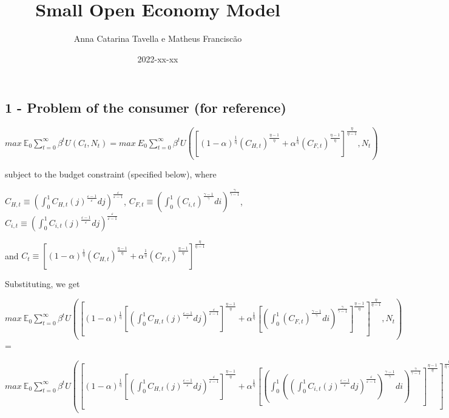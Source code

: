 \documentclass[
]{article}
\title{Small Open Economy Model}
\author{Anna Catarina Tavella e Matheus Franciscão}
\date{2022-xx-xx}
\begin{document}
\maketitle

\hypertarget{problem-of-the-consumer-for-reference}{%
\subsection{1 - Problem of the consumer (for
reference)}\label{problem-of-the-consumer-for-reference}}

\(\displaystyle {max} \ \mathbb{E}_0 \sum_{t=0}^\infty \beta^tU(C_t,N_t) = \displaystyle {max} \ E_0 \sum_{t=0}^\infty \beta^tU \left(\left[ (1-\alpha)^{\frac{1}{\eta}} (C_{H,t})^{\frac{\eta-1}{\eta}} + \alpha^{\frac{1}{\eta}} (C_{F,t})^{\frac{\eta-1}{\eta}} \right]^{\frac{\eta}{\eta-1}},N_t \right)\)

subject to the budget constraint (specified below), where

\(C_{H,t} \equiv \displaystyle \left( \int_0^1 C_{H,t}(j)^{\frac{\varepsilon-1}{\varepsilon}}dj \right) ^{\frac{\varepsilon}{\varepsilon-1}}\),
\(C_{F,t} \equiv \displaystyle \left( \int_0^1 (C_{i,t})^{\frac{\gamma-1}{\gamma}}di \right) ^{\frac{\gamma}{\gamma-1}}\),
\(C_{i,t} \equiv \displaystyle \left( \int_0^1 C_{i,t}(j)^{\frac{\varepsilon-1}{\varepsilon}}dj \right) ^{\frac{\varepsilon}{\varepsilon-1}}\)

and
\(C_t \equiv \left[ (1-\alpha)^{\frac{1}{\eta}} (C_{H,t})^{\frac{\eta-1}{\eta}} + \alpha^{\frac{1}{\eta}} (C_{F,t})^{\frac{\eta-1}{\eta}} \right]^{\frac{\eta}{\eta-1}}\)

Substituting, we get

\(\displaystyle {max} \ \mathbb{E}_0 \sum_{t=0}^\infty \beta^tU \left(\left[ (1-\alpha)^{\frac{1}{\eta}} \left [\displaystyle \left( \int_0^1 C_{H,t}(j)^{\frac{\varepsilon-1}{\varepsilon}}dj \right) ^{\frac{\varepsilon}{\varepsilon-1}} \right]^{\frac{\eta-1}{\eta}} + \alpha^{\frac{1}{\eta}} \left[ \displaystyle \left( \int_0^1 (C_{F,t})^{\frac{\gamma-1}{\gamma}}di \right) ^{\frac{\gamma}{\gamma-1}} \right]^{\frac{\eta-1}{\eta}} \right]^{\frac{\eta}{\eta-1}},N_t \right)\)
=

\(\displaystyle {max} \ \mathbb{E}_0 \sum_{t=0}^\infty \beta^tU \left(\left[ (1-\alpha)^{\frac{1}{\eta}} \left [\displaystyle \left( \int_0^1 C_{H,t}(j)^{\frac{\varepsilon-1}{\varepsilon}}dj \right) ^{\frac{\varepsilon}{\varepsilon-1}} \right]^{\frac{\eta-1}{\eta}} + \alpha^{\frac{1}{\eta}} \left[ \displaystyle \left( \int_0^1 \left( \displaystyle \left( \int_0^1 C_{i,t}(j)^{\frac{\varepsilon-1}{\varepsilon}}dj \right) ^{\frac{\varepsilon}{\varepsilon-1}} \right)^{\frac{\gamma-1}{\gamma}}di \right) ^{\frac{\gamma}{\gamma-1}} \right]^{\frac{\eta-1}{\eta}} \right]^{\frac{\eta}{\eta-1}},N_t \right)\)
\end{document}

